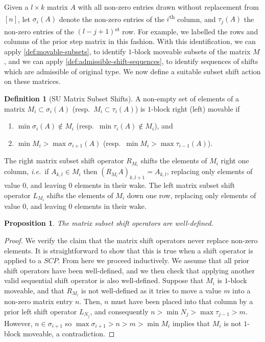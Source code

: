 \documentclass{amsart}
\newtheorem{proposition}[theorem]{Proposition}
\theoremstyle{definition}
\newtheorem{definition}[theorem]{Definition}
\newcommand{\ie}{\textit{i.e.}~} %
\newcommand{\ordinal}{\textsuperscript{th}} %
\newcommand{\ordinalst}{\textsuperscript{st}} %
\begin{document}
Given a $l\times k$ matrix $A$ with all non-zero entries drawn without replacement from $[n]$, let $\sigma_i(A)$ denote the non-zero entries of the $i$\ordinal{} column, and $\tau_j(A)$ the non-zero entries of the $(l-j+1)$\ordinalst{} row. 
For example, we labelled the rows and columns of the prior step matrix in this fashion.
With this identification, we can apply \cref{def:movable-subsets}, to identify $1$-block moveable subsets of the matrix $M$, and we can apply \cref{def:admissible-shift-sequences}, to identify sequences of shifts which are admissible of original type.
We now define a suitable subset shift action on these matrices.
\begin{definition} [SU Matrix Subset Shifts]
A non-empty set of elements of a matrix $M_i \subset \sigma_i(A)$ (resp.~$M_{i}\subset \tau_{i}(A)$) is $1$-block right (left) movable if
\begin{enumerate}
    \item $\min \sigma_i(A) \notin M_i$ (resp.~$\min \tau_{i}(A) \notin M_i$), and
    \item $\min M_i> \max \sigma_{i+1}(A)$ (resp.~$\min M_{i}> \max \tau_{i-1}(A)$).
\end{enumerate}
The right matrix subset shift operator $R_{M_i}$ shifts the elements of $M_i$ right one column, \ie if $A_{k,l} \in M_i$ then $(R_{M_i}A)_{k,l+1} = A_{k,l}$, replacing only elements of value $0$, and leaving $0$ elements in their wake.
The left matrix subset shift operator $L_{M_i}$ shifts the elements of $M_i$ down one row, replacing only elements of value $0$, and leaving $0$ elements in their wake.
\end{definition}
\begin{proposition}
The matrix subset shift operators are well-defined.
\end{proposition}
\begin{proof}
We verify the claim that the matrix shift operators never replace non-zero elements.
It is straightforward to show that this is true when a shift operator is applied to a $SCP$.
From here we proceed inductively.
We assume that all prior shift operators have been well-defined, and we then check that applying another valid sequential shift operator is also well-defined.
Suppose that $M_i$ is $1$-block moveable, and that $R_{M_i}$ is not well-defined as it tries to move a value $m$ into a non-zero matrix entry $n$.
Then, $n$ must have been placed into that column by a prior left shift operator $L_{N_j}$, and consequently $n>\min N_j > \max \tau_{j-1}> m$.
However, $n\in \sigma_{i+1}$ so $\max \sigma_{i+1}>n>m>\min M_i $ implies that $M_i$ is not $1$-block moveable, a contradiction.
\end{proof}
\end{document}
